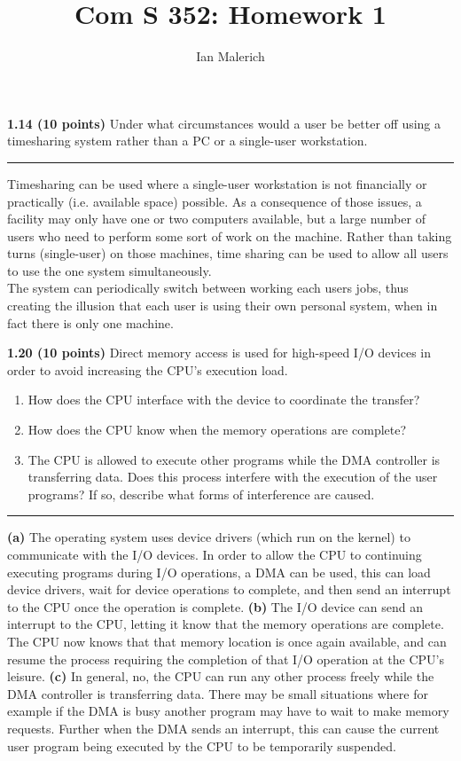 \documentclass[12pt]{jhwhw}
\author{Ian Malerich}
\title{Com S 352: Homework 1}
\begin{document}
\raggedright

\textbf{1.14 (10 points)} Under what circumstances would a user be better off using
a timesharing system rather than a PC or a single-user workstation.
\textcolor[RGB]{240,240,240}{\rule{\textwidth}{0.5pt}}\bigbreak

	\begin{addmargin}[1em]{}
		Timesharing can be used where a single-user workstation is not financially or
		practically (i.e. available space) possible. As a consequence of those issues, a facility
		may only have one or two computers available, but a large number of users
		who need to perform some sort of work on the machine. Rather than taking turns
		(single-user) on those machines, time sharing can be used to allow all users
		to use the one system simultaneously. \\
		The system can periodically switch between working each users jobs, thus creating
		the illusion that each user is using their own personal system, when in fact
		there is only one machine.
	\end{addmargin}

\bigbreak
\textbf{1.20 (10 points)} Direct memory access is used for high-speed I/O devices
in order to avoid increasing the CPU's execution load.
\begin{enumerate}
	\item How does the CPU interface with the device to coordinate the transfer?
	\item How does the CPU know when the memory operations are complete?
	\item The CPU is allowed to execute other programs while the DMA controller is
		transferring data. Does this process interfere with the execution of the user programs?
		If so, describe what forms of interference are caused.
\end{enumerate}
\textcolor[RGB]{240,240,240}{\rule{\textwidth}{0.5pt}}\bigbreak

	\begin{addmargin}[1em]{}
		\textbf{(a)} The operating system uses device drivers (which run on the kernel) to
			communicate with the I/O devices. In order to allow the CPU to continuing 
			executing programs during I/O operations, a DMA can be used, this can load 
			device drivers, wait for device operations to complete, and then send
			an interrupt to the CPU once the operation is complete.
		\bigbreak
		\textbf{(b)} The I/O device can send an interrupt to the CPU, letting it know that
			the memory operations are complete. The CPU now knows that that memory location is 
			once again available, and can resume the process requiring the completion
			of that I/O operation at the CPU's leisure.
		\bigbreak
		\textbf{(c)} In general, no, the CPU can run any other process freely while the DMA
			controller is transferring data. There may be small situations where
			for example if the DMA is busy another program may have to wait to make memory
			requests. Further when the DMA sends an interrupt, this can cause the current
			user program being executed by the CPU to be temporarily suspended.
	\end{addmargin}
\end{document}
